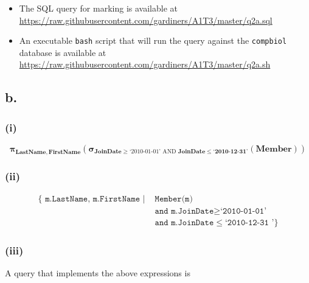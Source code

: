 \documentclass{article}
\newcommand{\select}[1]{
\boldsymbol{\sigma}_{#1}
}
\newcommand{\project}[1]{
\boldsymbol{\pi}_{#1}
}
\begin{document}
\begin{itemize}
    \item The SQL query for marking is available at \url{https://raw.githubusercontent.com/gardiners/A1T3/master/q2a.sql}
    \item An executable \texttt{bash} script that will run the query against the \texttt{compbiol} database is available at \url{https://raw.githubusercontent.com/gardiners/A1T3/master/q2a.sh}
\end{itemize}

\subsection{b.}

\subsubsection{(i)}

$$
\project{\mathbf{LastName, FirstName}}
\left(
\select{\mathbf{JoinDate} \geq \text{`2010-01-01' AND } \mathbf{JoinDate \leq \text{`2010-12-31'}}}
\left(\mathbf{Member}\right)
\right)
$$

\subsubsection{(ii)}

$$
\begin{aligned}
\{
\texttt{ m.LastName, m.FirstName } | &\texttt{ Member(m)} \\
    &\texttt{ and m.JoinDate} \geq \texttt{`2010-01-01'} \\
    &\texttt{ and m.JoinDate} \leq \texttt{`2010-12-31 '}
\}
\end{aligned}
$$

\subsubsection{(iii)}

A query that implements the above expressions is 
\end{document}
